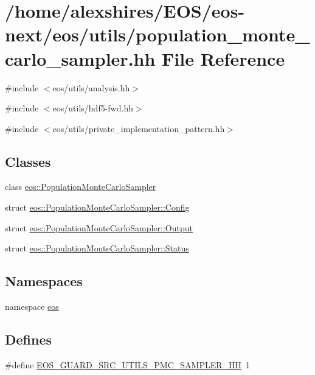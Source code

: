 \hypertarget{population__monte__carlo__sampler_8hh}{
\section{/home/alexshires/EOS/eos-\/next/eos/utils/population\_\-monte\_\-carlo\_\-sampler.hh File Reference}
\label{population__monte__carlo__sampler_8hh}
}
{\ttfamily \#include $<$eos/utils/analysis.hh$>$}\par
{\ttfamily \#include $<$eos/utils/hdf5-\/fwd.hh$>$}\par
{\ttfamily \#include $<$eos/utils/private\_\-implementation\_\-pattern.hh$>$}\par
\subsection*{Classes}
\begin{DoxyCompactItemize}
\item 
class \hyperlink{classeos_1_1PopulationMonteCarloSampler}{eos::PopulationMonteCarloSampler}
\item 
struct \hyperlink{structeos_1_1PopulationMonteCarloSampler_1_1Config}{eos::PopulationMonteCarloSampler::Config}
\item 
struct \hyperlink{structeos_1_1PopulationMonteCarloSampler_1_1Output}{eos::PopulationMonteCarloSampler::Output}
\item 
struct \hyperlink{structeos_1_1PopulationMonteCarloSampler_1_1Status}{eos::PopulationMonteCarloSampler::Status}
\end{DoxyCompactItemize}
\subsection*{Namespaces}
\begin{DoxyCompactItemize}
\item 
namespace \hyperlink{namespaceeos}{eos}
\end{DoxyCompactItemize}
\subsection*{Defines}
\begin{DoxyCompactItemize}
\item 
\#define \hyperlink{population__monte__carlo__sampler_8hh_ae7e0494552bb66a66453c50c27203a49}{EOS\_\-GUARD\_\-SRC\_\-UTILS\_\-PMC\_\-SAMPLER\_\-HH}~1
\end{DoxyCompactItemize}
